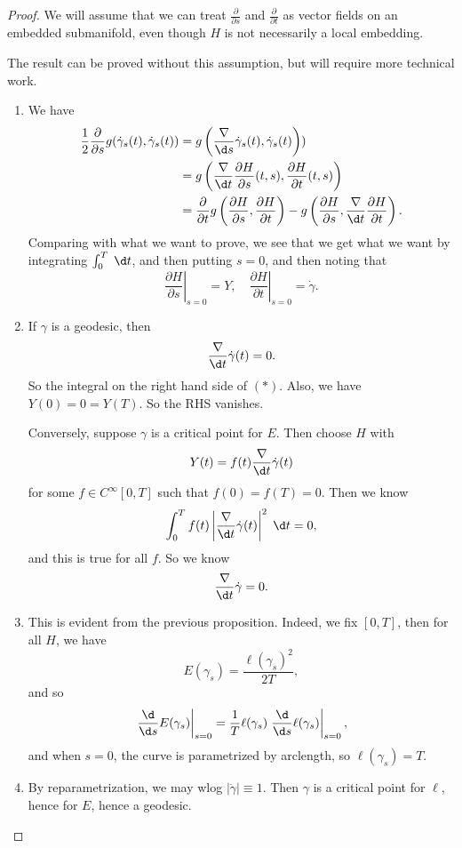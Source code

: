 \documentclass[a4paper]{article}
\begin{document}
\begin{proof}
  We will assume that we can treat $\frac{\partial}{\partial s}$ and $\frac{\partial}{\partial t}$ as vector fields on an embedded submanifold, even though $H$ is not necessarily a local embedding.

  The result can be proved without this assumption, but will require more technical work.
  \begin{enumerate}
    \item We have
      \begin{align*}
        \frac{1}{2} \frac{\partial}{\partial s} g(\dot{\gamma}_s(t), \dot{\gamma}_s(t)) &= g\left(\frac{\nabla}{\d s} \dot{\gamma}_s(t), \dot{\gamma}_s(t)\right))\\
        &= g\left(\frac{\nabla}{\d t} \frac{\partial H}{\partial s}(t, s), \frac{\partial H}{\partial t} (t, s)\right)\\
        &= \frac{\partial}{\partial t} g\left(\frac{\partial H}{\partial s}, \frac{\partial H}{\partial t}\right) - g \left(\frac{\partial H}{\partial s}, \frac{\nabla}{\d t} \frac{\partial H}{\partial t}\right).
      \end{align*}
      Comparing with what we want to prove, we see that we get what we want by integrating $\int_0^T\;\d t$, and then putting $s = 0$, and then noting that
      \[
        \left.\frac{\partial H}{\partial s}\right|_{s = 0} = Y,\quad \left.\frac{\partial H}{\partial t}\right|_{s = 0} = \dot{\gamma}.
      \]
    \item If $\gamma$ is a geodesic, then
      \[
        \frac{\nabla}{\d t} \dot{\gamma}(t) = 0.
      \]
      So the integral on the right hand side of $(*)$. Also, we have $Y(0) = 0 = Y(T)$. So the RHS vanishes.

      Conversely, suppose $\gamma$ is a critical point for $E$. Then choose $H$ with
      \[
        Y(t) = f(t) \frac{\nabla}{\d t} \dot{\gamma}(t)
      \]
      for some $f \in C^\infty[0, T]$ such that $f(0) = f(T) = 0$. Then we know
      \[
        \int_0^T f(t) \left|\frac{\nabla}{\d t} \dot{\gamma}(t)\right|^2 \;\d t = 0,
      \]
      and this is true for all $f$. So we know
      \[
        \frac{\nabla}{\d t}\dot{\gamma} = 0.
      \]
    \item This is evident from the previous proposition. Indeed, we fix $[0, T]$, then for all $H$, we have
      \[
        E(\gamma_s) = \frac{\ell (\gamma_s)^2}{2T},
      \]
      and so
      \[
        \left.\frac{\d}{\d s} E(\gamma_s)\right|_{s = 0} = \frac{1}{T} \ell(\gamma_s) \left.\frac{\d}{\d s}\ell(\gamma_s) \right|_{s = 0},
      \]
     and when $s = 0$, the curve is parametrized by arclength, so $\ell(\gamma_s) = T$.
   \item By reparametrization, we may wlog $|\dot{\gamma}| \equiv 1$. Then $\gamma$ is a critical point for $\ell$, hence for $E$, hence a geodesic.
  \end{enumerate}
\end{proof}
\end{document}
